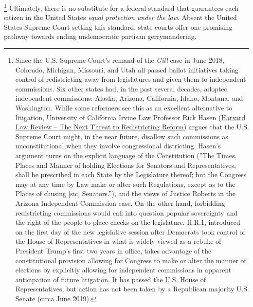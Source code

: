         \footnote{Since the U.S. Supreme Court's remand of the \textit{Gill} case in June 2018, Colorado, Michigan, Missouri, and Utah all passed ballot initiatives taking control of redistricting away from legislatures and given them to independent commissions. Six other states had, in the past several decades, adopted independent commissions: Alaska, Arizona, California, Idaho, Montana, and Washington. While some reformers see this as an excellent alternative to litigation, University of California Irvine Law Professor Rick Hasen (\href{https://blog.harvardlawreview.org/the-next-threat-to-redistricting-reform/}{Harvard Law Review -- The Next Threat to Redistricting Reform}) argues that the U.S. Supreme Court might, in the near future, disallow such commissions as unconstitutional when they involve congressional districting. Hasen's argument turns on the explicit language of the Constitution (''The Times, Places and Manner of holding Elections for Senators and Representatives, shall be prescribed in each State by the Legislature thereof; but the Congress may at any time by Law make or alter such Regulations, except as to the Places of chusing [sic] Senators.''), and the views of Justice Roberts in the Arizona Independent Commission case. On the other hand, forbidding redistricting commissions would call into question popular sovereignty and the right of the people to place checks on the legislature. H.R.1, introduced on the first day of the new legislative session after Democrats took control of the House of Representatives in what is widely viewed as a rebuke of President Trump's first two years in office, takes advantage of the constitutional provision allowing for Congress to make or alter the manner of elections by explicitly allowing for independent commissions in apparent anticipation of future litigation. It has passed the U.S. House of Representatives, but action has not been taken by a Republican majority U.S. Senate (circa June 2019).}
	Ultimately, there is no substitute for a federal standard that guarantees each citizen in the United States \textit{equal protection under the law}. Absent the United States Supreme Court setting this standard, state courts offer one promising pathway towards ending undemocratic partisan gerrymandering.
